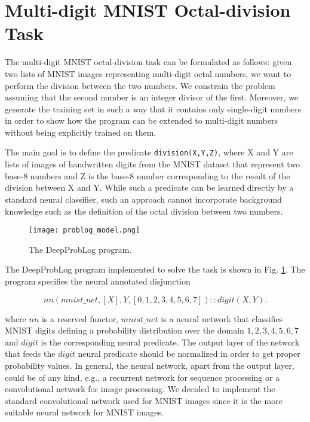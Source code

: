 \section{Multi-digit MNIST Octal-division Task}
\label{sec:task}

The multi-digit MNIST octal-division task can be formulated as follows: given two lists of MNIST images representing multi-digit octal numbers, we want to perform the division between the two numbers. We constrain the problem assuming that the second number is an integer divisor of the first. Moreover, we generate the training set in such a way that it contains only single-digit numbers in order to show how the program can be extended to multi-digit numbers without being explicitly trained on them.

The main goal is to define the predicate \texttt{division(X,Y,Z)}, where X and Y are lists of images of handwritten digits from the MNIST dataset that represent two base-8 numbers and Z is the base-8 number corresponding to the result of the division between X and Y. While such a predicate can be learned directly by a standard neural classifier, such an approach cannot incorporate background knowledge such as the definition of the octal division between two numbers.

\begin{figure}[ht]
\centerline{\texttt{[image: problog\_model.png]}}
\caption{The DeepProbLog program.}
\label{fig:program}
\end{figure}

The DeepProbLog program implemented to solve the task is shown in Fig. \ref{fig:program}. The program specifies the neural annotated disjunction

\begin{equation}
    nn(mnist\_net,[X],Y,[0,1,2,3,4,5,6,7]) :: digit(X,Y).
\end{equation}

where $nn$ is a reserved functor, $mnist\_net$ is a neural network that classifies MNIST digits defining a probability distribution over the domain ${1,2,3,4,5,6,7}$ 
and $digit$ is the corresponding neural predicate. The output layer of the network that feeds the $digit$ neural predicate should be normalized in order to get proper probability values. In general, the neural network, apart from the output layer, could be of any kind, e.g., a recurrent network for sequence processing or a convolutional network for image processing. We decided to implement the standard convolutional network used for MNIST images since it is the more suitable neural network for MNIST images. %

